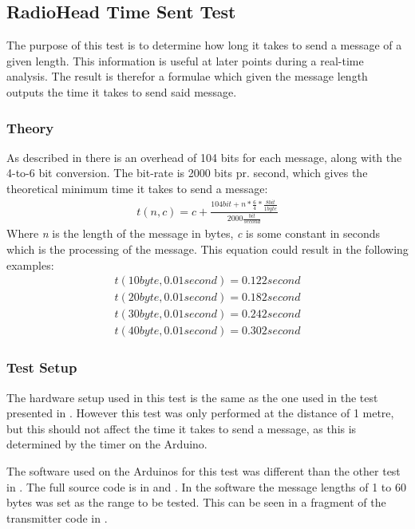 \subsection{RadioHead Time Sent Test} %
\label{sub:radiohead_time_sent_test}
The purpose of this test is to determine how long it takes to send a message of a given length.
This information is useful at later points during a real-time analysis.
The result is therefor a formulae which given the message length outputs the time it takes to send said message. 

\subsubsection*{Theory}
As described in  there is an overhead of 104 bits for each message, along with the 4-to-6 bit conversion.
The bit-rate is 2000 bits pr. second, which gives the theoretical minimum time it takes to send a message:
\begin{align*}
t(n,c)=c+\frac { 104 bit+n*\frac { 6 }{ 4 } *\frac { 8 bit }{ 1 byte }  }{ 2000\frac { bit }{ second }  } 
\end{align*}
Where \textit{n} is the length of the message in bytes, \textit{c} is some constant in seconds which is the processing of the message. This equation could result in the following examples:
\begin{align*}
t(10 byte, 0.01 second) = 0.122 second\\
t(20 byte, 0.01 second) = 0.182 second\\
t(30 byte, 0.01 second) = 0.242 second\\
t(40 byte, 0.01 second) = 0.302 second
\end{align*}

\subsubsection*{Test Setup}
The hardware setup used in this test is the same as the one used in the test presented in .
However this test was only performed at the distance of 1 metre, but this should not affect the time it takes to send a message, as this is determined by the timer on the Arduino.

The software used on the Arduinos for this test was different than the other test in . 
The full source code is in  and .
In the software the message lengths of 1 to 60 bytes was set as the range to be tested. This can be seen in a fragment of the transmitter code in .

